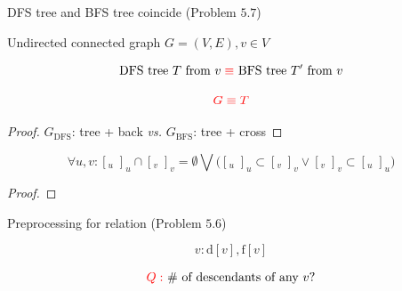 \begin{frame}{}
  \begin{exampleblock}{DFS tree and BFS tree coincide (Problem $5.7$)}
    \centerline{Undirected connected graph $G = (V,E), v \in V$}
      
    \[
      \text{DFS tree } T \text{ from } v \;\textcolor{red}{\equiv} \text{ BFS tree } T' \text{ from } v
    \]

    \pause
    \[
      \textcolor{red}{G \equiv T}
    \]
  \end{exampleblock}

  \pause
  \vspace{0.30cm}
  \begin{proof}
    \centerline{$G_{\text{DFS}}$: tree + back \emph{vs.} $G_{\text{BFS}}$: tree + cross}
  \end{proof}

  \pause
  \vspace{0.30cm}
  \begin{center}
  \end{center}
\end{frame}
\begin{frame}{}
  \centerline{}
\end{frame}
\begin{frame}{}
  \begin{theorem}
    \[
      \forall u,v: [_{u} \; ]_{u} \cap [_{v} \; ]_{v} = \emptyset \bigvee 
      \Big([_{u} \; ]_{u} \subset [_{v} \; ]_{v} \lor [_{v} \; ]_{v} \subset [_{u} \; ]_{u}\Big)
    \]
  \end{theorem}

  \pause

  \begin{proof}
  \end{proof}
\end{frame}
\begin{frame}{}
  \begin{exampleblock}{Preprocessing for  relation (Problem $5.6$)}

    \centerline{}
  \end{exampleblock}

  \pause
  \[
    v: \text{d}[v], \text{f}[v]
  \]

  \pause
  \vspace{-0.20cm}
  \[
    \textcolor{red}{Q: } \text{ \# of descendants of any } v?
  \]
\end{frame}

